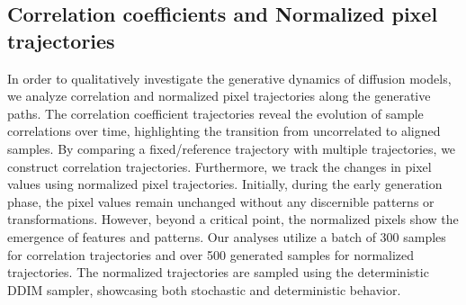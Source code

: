\clearpage
\subsection{Correlation coefficients and Normalized pixel trajectories}
\label{sub:correlation_normalized}

In order to qualitatively investigate the generative dynamics of diffusion models, we analyze correlation and normalized pixel trajectories along the generative paths. The correlation coefficient trajectories reveal the evolution of sample correlations over time, highlighting the transition from uncorrelated to aligned samples. By comparing a fixed/reference trajectory with multiple trajectories, we construct correlation trajectories. Furthermore, we track the changes in pixel values using normalized pixel trajectories. Initially, during the early generation phase, the pixel values remain unchanged without any discernible patterns or transformations. However, beyond a critical point, the normalized pixels show the emergence of features and patterns. Our analyses utilize a batch of 300 samples for correlation trajectories and over 500 generated samples for normalized trajectories. The normalized trajectories are sampled using the deterministic DDIM sampler, showcasing both stochastic and deterministic behavior.

